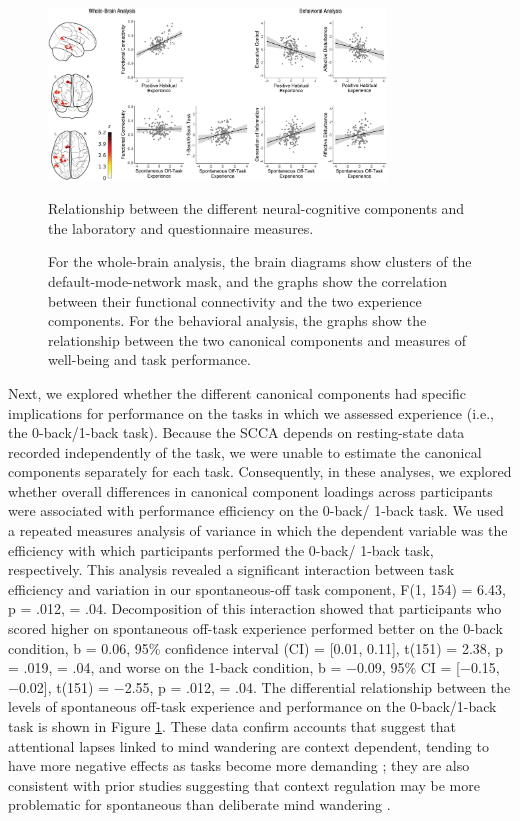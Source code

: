\begin{figure}
	\centering
	\includegraphics[width=0.8\textwidth]{chapters/img/study1fig4.jpeg}
	\caption{Relationship between the different neural-cognitive components and the laboratory and questionnaire measures.}
	\caption*{For the whole-brain analysis, the brain diagrams show clusters of the default-mode-network mask, and the graphs show the correlation between their functional connectivity and the two experience components. For the behavioral analysis, the graphs show the relationship between the two canonical components and measures of well-being and task performance.}

	\label{fig:study1:fig4}
\end{figure}

Next, we explored whether the different canonical components had specific implications for performance on the tasks in which we assessed experience (i.e., the 0-back/1-back task). Because the SCCA depends on resting-state data recorded independently of the task, we were unable to estimate the canonical components separately for each task. Consequently, in these analyses, we explored whether overall differences in canonical component loadings across participants were associated with performance efficiency on the 0-back/ 1-back task. We used a repeated measures analysis of variance in which the dependent variable was the efficiency with which participants performed the 0-back/ 1-back task, respectively. This analysis revealed a significant interaction between task efficiency and variation in our spontaneous-off task component, F(1, 154) = 6.43, p = .012, \paretasquared = .04. Decomposition of this interaction showed that participants who scored higher on spontaneous off-task experience performed better on the 0-back condition, b = 0.06, 95\% confidence interval (CI) = [0.01, 0.11], t(151) = 2.38, p = .019, \paretasquared = .04, and worse on the 1-back condition, b = −0.09, 95\% CI = [−0.15, −0.02], t(151) = −2.55, p = .012, \paretasquared = .04. The differential relationship between the levels of spontaneous off-task experience and performance on the 0-back/1-back task is shown in Figure \ref{fig:study1:fig4}. These data confirm accounts that suggest that attentional lapses linked to mind wandering are context dependent, tending to have more negative effects as tasks become more demanding \cite{Smallwood2013a}; they are also consistent with prior studies suggesting that context regulation may be more problematic for spontaneous than deliberate mind wandering \cite<see also>{Seli2016}.

